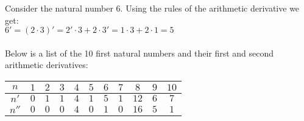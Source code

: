 \documentclass[12pt]{article}
\begin{document}
Consider the natural number $6$. Using the rules of the arithmetic derivative we get: \\ $6'=(2\cdot3)'=2'\cdot 3+2\cdot 3'=1\cdot 3+2\cdot 1=5$ \\
\\ Below is a list of the 10 first natural numbers and their first and second arithmetic derivatives:\\
\begin{tabular}{|c|cccccccccc|}
\hline
$n$&$1$&$2$&$3$&$4$&$5$&$6$&$7$&$8$&$9$&$10$ \\
\hline
$n'$&$0$&$1$&$1$&$4$&$1$&$5$&$1$&$12$&$6$&$7$ \\ 
$n''$&$0$&$0$&$0$&$4$&$0$&$1$&$0$&$16$&$5$&$1$ \\ 
\hline
\end{tabular}
\end{document}
